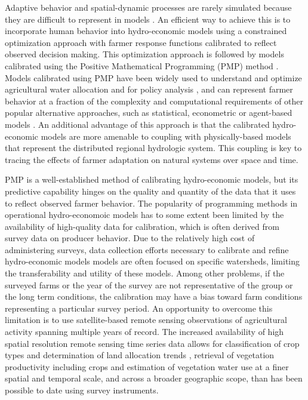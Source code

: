 Adaptive behavior and spatial-dynamic processes are rarely simulated because they are difficult to represent in models \citep{Aerts2018, Wens2019}. An efficient way to achieve this is to incorporate human behavior into hydro-economic models using a constrained optimization approach with farmer response functions calibrated to reflect observed decision making. This optimization approach is followed by models calibrated using the Positive Mathematical Programming (PMP) method \citep[][]{Howitt1995}. Models calibrated using PMP have been widely used to understand and optimize agricultural water allocation and for policy analysis \citep{Maneta2009c, Medellin-Azuara2008, Torres2011a, Ghosh2014, Kahil2016, Heckelei2013, Graveline2014, Connell-Buck2011, Medellin-Azuara2011, USBoR2011, DWR2009, Cobourn2011}, and can represent farmer behavior at a fraction of the complexity and computational requirements of other popular alternative approaches, such as statistical, econometric or agent-based models \citep{Wurster2019, Ng2011, Weersink2002}. An additional advantage of this approach is that the calibrated hydro-economic models are more amenable to coupling with physically-based models that represent the distributed regional hydrologic system. This coupling is key to tracing the effects of farmer adaptation on natural systems over space and time. 

PMP is a well-established method of calibrating hydro-economic models, but its predictive capability hinges on the quality and quantity of the data that it uses to reflect observed farmer behavior. The popularity of programming methods in operational hydro-economoic models has to some extent been limited by the availability of high-quality data for calibration, which is often derived from survey data on producer behavior. Due to the relatively high cost of administering surveys, data collection efforts necessary to calibrate and refine hydro-economic models models are often focused on specific watersheds, limiting the transferability and utility of these models. Among other problems, if the surveyed farms or the year of the survey are not representative of the group or the long term conditions, the calibration may have a bias toward farm conditions representing a particular survey period. An opportunity to overcome this limitation is to use satellite-based remote sensing observations of agricultural activity spanning multiple years of record. The increased availability of high spatial resolution remote sensing time series data allows for classification of crop types and determination of land allocation trends \citep{USDANASS2015}, retrieval of vegetation productivity including crops \citep{He2018, Mu2009} and estimation of vegetation water use \citep{He2019, Zhang2010, Allen2007} at a finer spatial and temporal scale, and across a broader geographic scope, than has been possible to date using survey instruments.

